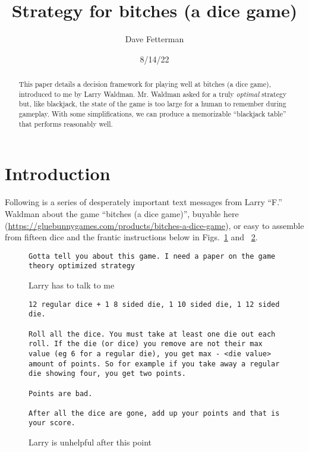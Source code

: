 \documentclass[11pt, oneside]{article} 	%
\title{Strategy for bitches (a dice game)}
\author{Dave Fetterman}
\affil{Obviously Unemployed}
\date{8/14/22}
\begin{document}
\maketitle

\begin{abstract}

This paper details a decision framework for playing well at bitches (a dice game), introduced to me by Larry Waldman.  Mr. Waldman asked for a truly \emph{optimal} strategy but, like blackjack, the state of the game is too large for a human to remember during gameplay.  With some simplifications, we can produce a memorizable ``blackjack table'' that performs reasonably well.

\end{abstract}

\section{Introduction}

Following is a series of desperately important text messages from Larry ``F.'' Waldman about the game ``bitches (a dice game)'', buyable here (\url{https://gluebunnygames.com/products/bitches-a-dice-game}), or easy to assemble from fifteen dice and the frantic instructions below in Figs.~\ref{fig:larry1} and ~\ref{fig:larry2}.

\begin{figure}[!htb]
\begin{lstlisting}
Gotta tell you about this game. I need a paper on the game theory optimized strategy
\end{lstlisting}
\caption{Larry has to talk to me}
\label{fig:larry1}
\end{figure}


\begin{figure}[!htb]
\begin{lstlisting}
12 regular dice + 1 8 sided die, 1 10 sided die, 1 12 sided die. 

Roll all the dice. You must take at least one die out each roll. If the die (or dice) you remove are not their max value (eg 6 for a regular die), you get max - <die value> amount of points. So for example if you take away a regular die showing four, you get two points. 

Points are bad. 

After all the dice are gone, add up your points and that is your score.
\end{lstlisting}
\caption{Larry is unhelpful after this point}
\label{fig:larry2}
\end{figure}
\end{document}
